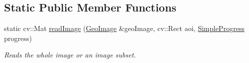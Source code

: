 \subsection*{Static Public Member Functions}
\begin{DoxyCompactItemize}
\item 
static cv\+::\+Mat \hyperlink{classdg_1_1deepcore_1_1imagery_1_1_geo_image_a69395b8c1f7982df256d62dd4996a3cf}{read\+Image} (\hyperlink{classdg_1_1deepcore_1_1imagery_1_1_geo_image}{Geo\+Image} \&geo\+Image, cv\+::\+Rect aoi, \hyperlink{group___utility_module_ga6763018df79e4bdbcd8cd14cea5342b2}{Simple\+Progress} progress)
\begin{DoxyCompactList}\small\item\em Reads the whole image or an image subset. \end{DoxyCompactList}\end{DoxyCompactItemize}
